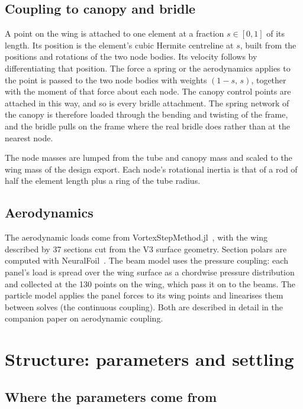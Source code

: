 \documentclass[11pt,a4paper]{article}
\begin{document}
\subsection{Coupling to canopy and bridle}

A point on the wing is attached to one element at a fraction $s\in[0,1]$ of its length. Its position is the element's cubic Hermite centreline at $s$, built from the positions and rotations of the two node bodies. Its velocity follows by differentiating that position. The force a spring or the aerodynamics applies to the point is passed to the two node bodies with weights $(1-s,\,s)$, together with the moment of that force about each node. The canopy control points are attached in this way, and so is every bridle attachment. The spring network of the canopy is therefore loaded through the bending and twisting of the frame, and the bridle pulls on the frame where the real bridle does rather than at the nearest node.

The node masses are lumped from the tube and canopy mass and scaled to the wing mass of the design export. Each node's rotational inertia is that of a rod of half the element length plus a ring of the tube radius.

\subsection{Aerodynamics}

The aerodynamic loads come from VortexStepMethod.jl~\cite{vortexstepmethod}, with the wing described by 37 sections cut from the V3 surface geometry. Section polars are computed with NeuralFoil~\cite{neuralfoil}. The beam model uses the pressure coupling: each panel's load is spread over the wing surface as a chordwise pressure distribution and collected at the 130 points on the wing, which pass it on to the beams. The particle model applies the panel forces to its wing points and linearises them between solves (the continuous coupling). Both are described in detail in the companion paper on aerodynamic coupling.

\section{Structure: parameters and settling}
\label{sec:structure}

\subsection{Where the parameters come from}
\end{document}
